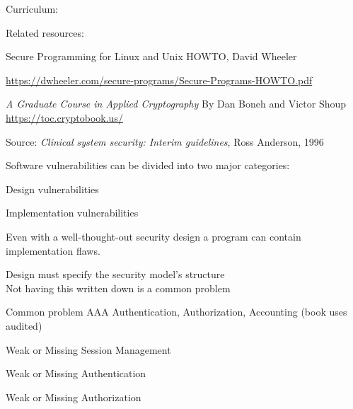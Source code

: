 \documentclass[Screen16to9,17pt]{foils}
\begin{document}

Curriculum:

Related resources:
\begin{list1}
\item Secure Programming for Linux and Unix HOWTO, David Wheeler
\item \url{https://dwheeler.com/secure-programs/Secure-Programs-HOWTO.pdf}
\item \emph{A Graduate Course in Applied Cryptography} By Dan Boneh and Victor Shoup\\ \url{https://toc.cryptobook.us/}
\end{list1}





Source:
\emph{Clinical system security: Interim guidelines}, Ross Anderson, 1996



Software vulnerabilities can be divided into two major categories:
\begin{list2}
\item Design vulnerabilities
\item Implementation vulnerabilities
\end{list2}

Even with a well-thought-out security design a program can contain implementation flaws.


\begin{list2}
\item Design must specify the security model's structure\\
Not having this written down is a common problem
\item Common problem AAA Authentication, Authorization, Accounting (book uses audited)
\item Weak or Missing Session Management
\item Weak or Missing Authentication
\item Weak or Missing Authorization
\end{list2}
\end{document}
